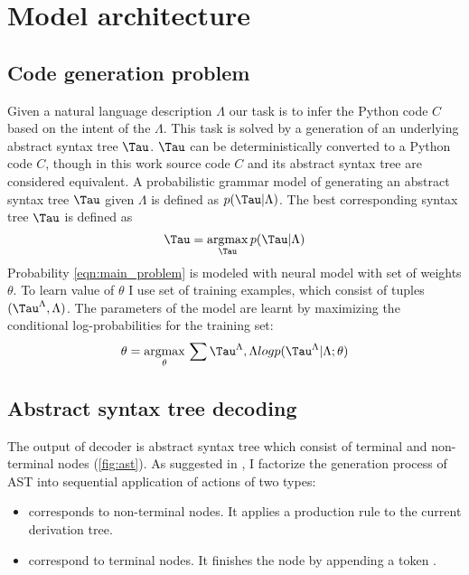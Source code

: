 \chapter{Model architecture} 
\label{Chapter4}

\section{Code generation problem}
Given a natural language description $\Lambda$ our task is to infer the Python code $C$ based on the intent of the $\Lambda$. This task is solved by a generation of an underlying abstract syntax tree $\Tau$. $\Tau$ can be deterministically converted to a Python code $C$, though in this work source code $C$ and its abstract syntax tree are considered equivalent. A probabilistic grammar model of generating an abstract syntax tree $\Tau$ given $\Lambda$ is defined as $p(\Tau|\Lambda)$. The best corresponding syntax tree $\Tau$ is defined as
\begin{equation}
\Tau=\underset{\Tau}{\operatorname{argmax}}\, p(\Tau|\Lambda)
\label{eqn:main_problem}
\end{equation}
Probability \ref{eqn:main_problem} is modeled with neural model with set of weights $\theta$. To learn value of $\theta$ I use set of training examples, which consist of tuples $(\Tau^{\Lambda}, \Lambda)$. The parameters of the model are learnt by maximizing the conditional log-probabilities for the training set:
\begin{equation}
\theta=\underset{\theta}{\operatorname{argmax}}\, \sum{\Tau^{\Lambda}, \Lambda} log p(\Tau^{\Lambda}|\Lambda; \theta)
\label{eqn:mle}
\end{equation}
\section{Abstract syntax tree decoding}
The output of decoder is abstract syntax tree which consist of terminal and non-terminal nodes (\ref{fig:ast}). As suggested in \cite{Yin2017}, I factorize the generation process of AST into sequential application of actions of two types:
\begin{itemize}
	\item {} corresponds to non-terminal nodes. It applies a production rule  to the current derivation tree.
	\item {} correspond to terminal nodes. It finishes the node by appending a token .
\end{itemize}

